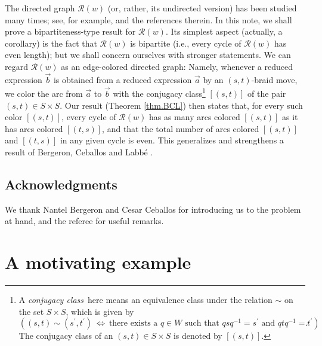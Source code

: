 \documentclass
[numbers=enddot,12pt,final,onecolumn,notitlepage,abstracton]{scrartcl}%
\theoremstyle{definition}
\begin{document}
The directed graph $\mathcal{R}\left(  w\right)  $ (or, rather, its undirected
version) has been studied many times; see, for example, \cite{ReiRoi11} and
the references therein. In this note, we shall prove a bipartiteness-type
result for $\mathcal{R}\left(  w\right)  $. Its simplest aspect (actually, a
corollary) is the fact that $\mathcal{R}\left(  w\right)  $ is bipartite
(i.e., every cycle of $\mathcal{R}\left(  w\right)  $ has even length); but we
shall concern ourselves with stronger statements. We can regard $\mathcal{R}%
\left(  w\right)  $ as an edge-colored directed graph: Namely, whenever a
reduced expression $\overrightarrow{b}$ is obtained from a reduced expression
$\overrightarrow{a}$ by an $\left(  s,t\right)  $-braid move, we color the arc
from $\overrightarrow{a}$ to $\overrightarrow{b}$ with the conjugacy
class\footnote{A \emph{conjugacy class}\ here means an equivalence class under
the relation $\sim$ on the set $S\times S$, which is given by
\[
\left(  \left(  s,t\right)  \sim\left(  s^{\prime},t^{\prime}\right)
\ \Longleftrightarrow\ \text{there exists a }q\in W\text{ such that }%
qsq^{-1}=s^{\prime}\text{ and }qtq^{-1}=t^{\prime}\right)  .
\]
The conjugacy class of an $\left(  s,t\right)  \in S\times S$ is denoted by
$\left[  \left(  s,t\right)  \right]  $.} $\left[  \left(  s,t\right)
\right]  $ of the pair $\left(  s,t\right)  \in S\times S$. Our result
(Theorem \ref{thm.BCL}) then states that, for every such color $\left[
\left(  s,t\right)  \right]  $, every cycle of $\mathcal{R}\left(  w\right)  $
has as many arcs colored $\left[  \left(  s,t\right)  \right]  $ as it has
arcs colored $\left[  \left(  t,s\right)  \right]  $, and that the total
number of arcs colored $\left[  \left(  s,t\right)  \right]  $ and $\left[
\left(  t,s\right)  \right]  $ in any given cycle is even. This generalizes
and strengthens a result of Bergeron, Ceballos and Labb\'{e} \cite[Theorem
3.1]{BCL}.

\subsection*{Acknowledgments}

We thank Nantel Bergeron and Cesar Ceballos for introducing us to the problem
at hand, and the referee for useful remarks.

\section{\label{sect.motivate-ex}A motivating example}
\end{document}
